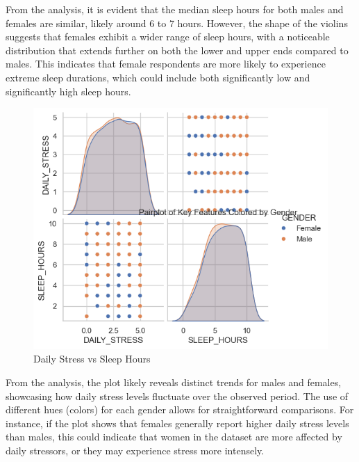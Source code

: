 \documentclass[runningheads]{llncs}
\begin{document}
\begin{enumerate}
From the analysis, it is evident that the median sleep hours for both males and females are similar, likely around 6 to 7 hours. However, the shape of the violins suggests that females exhibit a wider range of sleep hours, with a noticeable distribution that extends further on both the lower and upper ends compared to males. This indicates that female respondents are more likely to experience extreme sleep durations, which could include both significantly low and significantly high sleep hours.

\newpage
\begin{figure}
    \centering
    \includegraphics[width=1.0\linewidth]{eda9.png}
    \caption{Daily Stress vs Sleep Hours} 
    \label{fig:enter-label}
\end{figure}

From the analysis, the plot likely reveals distinct trends for males and females, showcasing how daily stress levels fluctuate over the observed period. The use of different hues (colors) for each gender allows for straightforward comparisons. For instance, if the plot shows that females generally report higher daily stress levels than males, this could indicate that women in the dataset are more affected by daily stressors, or they may experience stress more intensely.


\end{enumerate}
\end{document}
